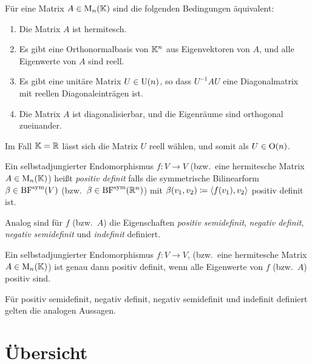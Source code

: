 \begin{corollary}
  \label{corollary: hermitian matrices are diagonalizable}
  Für eine Matrix $A \in \operatorname{M}_{n}(\mathbb{K})$ sind die folgenden Bedingungen äquivalent:
  \begin{enumerate}
    \item
      Die Matrix $A$ ist hermitesch.
    \item
      Es gibt eine Orthonormalbasis von $\mathbb{K}^n$ aus Eigenvektoren von $A$, und alle Eigenwerte von $A$ sind reell.
    \item
      Es gibt eine unitäre Matrix $U \in \operatorname{U}(n)$, so dass $U^{-1} A U$ eine Diagonalmatrix mit reellen Diagonaleinträgen ist.
    \item
      Die Matrix $A$ ist diagonalisierbar, und die Eigenräume sind orthogonal zueinander.
  \end{enumerate}
  Im Fall $\mathbb{K} = \mathbb{R}$ lässt sich die Matrix $U$ reell wählen, und somit als $U \in \operatorname{O}(n)$.
\end{corollary}

\begin{definition}
  Ein selbstadjungierter Endomorphismus $f \colon V \to V$ \textup(bzw.\ eine hermitesche Matrix $A \in \operatorname{M}_{n}(\mathbb{K})$\textup) heißt \emph{positiv definit} falls die symmetrische Bilinearform $\beta \in \operatorname{BF}^{\operatorname{sym}}(V)$ \textup(bzw.\ $\beta \in \operatorname{BF}^{\operatorname{sym}}(\mathbb{R}^n)$\textup) mit $\beta(v_1, v_2) \coloneqq \left\langle f(v_1), v_2 \right\rangle$ positiv definit ist.
  
  Analog sind für $f$ \textup(bzw.\ $A$\textup) die Eigenschaften \emph{positiv semidefinit}, \emph{negativ definit}, \emph{negativ semidefinit} und \emph{indefinit} definiert.
\end{definition}

\begin{corollary}
  Ein selbstadjungierter Endomorphismus $f \colon V \to V$, \textup(bzw.\ eine hermitesche Matrix $A \in \operatorname{M}_{n}(\mathbb{K})$\textup) ist genau dann positiv definit, wenn alle Eigenwerte von $f$ \textup(bzw.\ $A$\textup) positiv sind.
  
  Für positiv semidefinit, negativ definit, negativ semidefinit und indefinit definiert gelten die analogen Aussagen.
\end{corollary}





\section{Übersicht}

